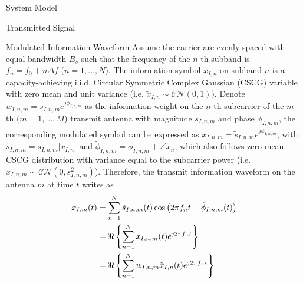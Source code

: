 \documentclass{IEEEtran}
\begin{document}
\begin{section} {System Model}
\begin{subsection} {Transmitted Signal}
            \begin{subsubsection} {Modulated Information Waveform}
                Assume the carrier are evenly spaced with equal bandwidth $B_s$ such that the frequency of the $n$-th subband is $f_n = f_0+n \Delta f$ ($n = 1,\dots,N$). The information symbol $\tilde{x}_{I,n}$ on subband $n$ is a capacity-achieving i.i.d. Circular Symmetric Complex Gaussian (CSCG) variable with zero mean and unit variance (i.e. $\tilde{x}_{I,n} \sim \mathcal{CN}(0,1)$). Denote $w_{I,n,m} = s_{I,n,m} e^{j\phi_{I,n,m}}$ as the information weight on the $n$-th subcarrier of the $m$-th ($m = 1,\dots,M$) transmit antenna with magnitude $s_{I,n,m}$ and phase $\phi_{I,n,m}$, the corresponding modulated symbol can be expressed as $x_{I,n,m} = \tilde{s}_{I,n,m} e^{j\tilde{\phi}_{I,n,m}}$, with $\tilde{s}_{I,n,m} = s_{I,n,m} \lvert\tilde{x}_{I,n}\rvert$ and $\tilde{\phi}_{I,n,m} = \phi_{I,n,m} + \angle{\tilde{x}_n}$, which also follows zero-mean CSCG distribution with variance equal to the subcarrier power (i.e. $x_{I,n,m} \sim \mathcal{CN}(0,s_{I,n,m}^2)$). Therefore, the transmit information waveform on the antenna $m$ at time $t$ writes as
                \begin{equation} \label{eq:x_{I,m}(t)}
                    \begin{split}
                        x_{I,m}(t)
                        &= \sum_{n=1}^{N} \tilde{s}_{I,n,m}(t) \cos \left( 2 \pi f_n t + \tilde{\phi}_{I,n,m}(t) \right) \\
                        &= \Re \left\{ \sum_{n=1}^{N} x_{I,n,m}(t) e^{j2 \pi f_n t} \right\} \\
                        &= \Re \left\{ \sum_{n=1}^{N} w_{I,n,m} \tilde{x}_{I,n}(t) e^{j2 \pi f_n t} \right\}
                    \end{split}
                \end{equation}
            \end{subsubsection}


\end{subsection}
\end{section}
\end{document}
